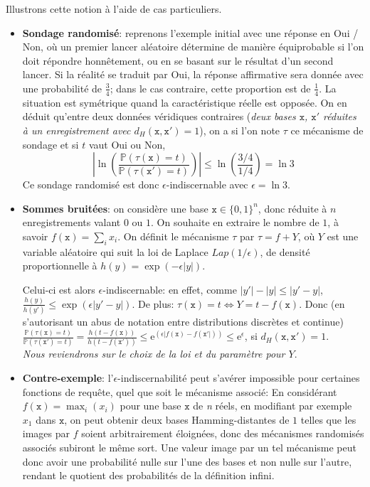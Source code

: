 \documentclass[a4paper,11pt]{article} %
\begin{document}
Illustrons cette notion à l'aide de cas particuliers.
\begin{itemize}
    \item 
    \textbf{Sondage randomisé}: reprenons l'exemple initial avec une réponse en \og Oui\fg{} / \og Non\fg{}, où un premier lancer aléatoire détermine de manière équiprobable si l'on doit répondre honnêtement, ou en se basant sur le résultat d'un second lancer. Si la réalité se traduit par \og Oui\fg{}, la réponse affirmative sera donnée avec une probabilité de $\frac{3}{4}$; dans le cas contraire, cette proportion est de $\frac{1}{4}$. La situation est symétrique quand la caractéristique réelle est opposée. On en déduit qu'entre deux données véridiques contraires (\emph{deux bases $\mathtt{x}$, $\mathtt{x'}$ réduites à un enregistrement avec $d_H(\mathtt{x},\mathtt{x'})=1$}), on a si l'on note $\tau$ ce mécanisme de sondage et si $t$ vaut \og Oui\fg{} ou \og Non\fg{},
    \[\left|\ln\left(\frac{\mathbb{P}(\tau(\mathtt{x})=t)}{\mathbb{P}(\tau(\mathtt{x'})=t)}\right)\right| 
    \leqslant
    \ln \left( \frac{3/4}{1/4} \right)
    = \ln 3\]
    Ce sondage randomisé est donc $\epsilon$-indiscernable avec $\epsilon=\ln 3$.    
    \item 
    \textbf {Sommes bruitées}: on considère une base $\mathtt{x}\in\{0,1\}^n$, donc réduite à $n$ enregistrements valant $0$ ou $1$. On souhaite en extraire le nombre de $1$, à savoir $f(\mathtt{x})=\sum_i{x_i}$. On définit le mécanisme $\tau$ par $\tau=f+Y$, où $Y$ est une variable aléatoire qui suit la loi de Laplace $Lap(1/\epsilon)$, de densité proportionnelle à $h(y)=\exp(-\epsilon|y|)$. 
    
    Celui-ci est alors $\epsilon$-indiscernable: en effet, comme $|y'|-|y|\leqslant|y'-y|$,\\ $\frac{h(y)}{h(y')}\leqslant\exp\left(\epsilon|y'-y|\right)$. De plus: $\tau(\mathtt{x})=t \Leftrightarrow Y = t-f(\mathtt{x})$.
    Donc (en s'autorisant un abus de notation entre distributions discrètes et continue)  $\frac{\mathbb{P}\left(\tau(\mathtt{x})=t\right)}{\mathbb{P}\left(\tau(\mathtt{x'})=t\right)}=
    \frac{h\left(t-f(\mathtt{x})\right)}{h\left(t-f(\mathtt{x'})\right)}\leqslant\mathrm{e}^{\left(\epsilon|f(\mathtt{x})-f(\mathtt{x'}|)\right)}\leqslant\mathrm{e}^{\epsilon}$, 
    si $d_H(\mathtt{x},\mathtt{x'})=1$.\\[0.2em]
    \emph{Nous reviendrons sur le choix de la loi et du paramètre pour $Y$}.
    \item 
    \textbf{Contre-exemple}: l'$\epsilon$-indiscernabilité peut s'avérer impossible pour certaines fonctions de requête, quel que soit le mécanisme associé:
    En considérant $f(\mathtt{x})=\max_i(x_i)$ pour une base $\mathtt{x}$ de \textit{n} réels, en modifiant par exemple $x_1$ dans $\mathtt{x}$, on peut obtenir deux bases Hamming-distantes de $1$ telles que les images par $f$ soient arbitrairement éloignées, donc des mécanismes randomisés associés subiront le même sort. Une valeur
    image par un tel mécanisme peut donc avoir une probabilité nulle sur l'une des bases et non nulle sur l'autre, rendant le quotient des probabilités de la définition infini.
\end{itemize}
\end{document}
